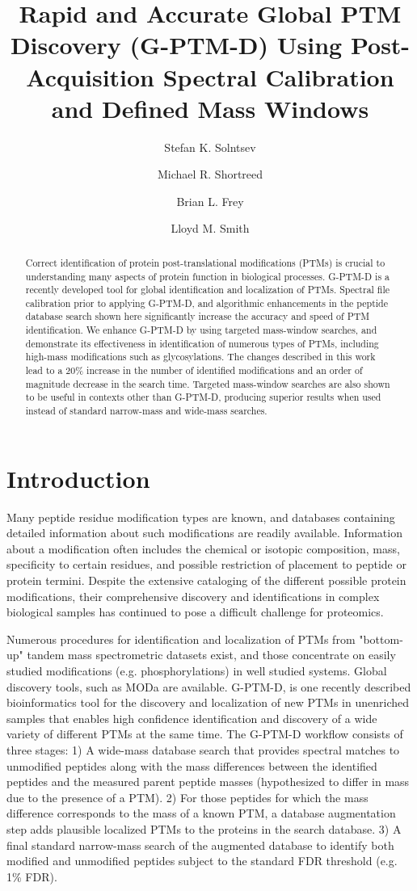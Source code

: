 \documentclass[journal=jprobs,manuscript=article]{achemso}
\author{Stefan K. Solntsev}
\author{Michael R. Shortreed}
\author{Brian L. Frey}
\author{Lloyd M. Smith}
\affiliation[UwMadison]
{University of Wisconsin-Madison}
\title[Rapid and Accurate Global PTM Discovery (G-PTM-D) Using Post-Acquisition Spectral Calibration and Defined Mass Windows]
  {Rapid and Accurate Global PTM Discovery (G-PTM-D) Using Post-Acquisition Spectral Calibration and Defined Mass Windows}
\begin{document}
\begin{abstract}

Correct identification of protein post-translational modifications (PTMs) is crucial to understanding many aspects of protein function in biological processes.
G-PTM-D\cite{Li_2016} is a recently developed tool for global identification and localization of PTMs.
Spectral file calibration prior to applying G-PTM-D, and algorithmic enhancements in the peptide database search shown here significantly increase the accuracy and speed of PTM identification.
We enhance G-PTM-D by using targeted mass-window searches, and demonstrate its effectiveness in identification of numerous types of PTMs, including high-mass modifications such as glycosylations.
The changes described in this work lead to a 20\% increase in the number of identified modifications and an order of magnitude decrease in the search time.
Targeted mass-window searches are also shown to be useful in contexts other than G-PTM-D, producing superior results when used instead of standard narrow-mass and wide-mass searches.
\end{abstract}

\section{Introduction}

Many peptide residue modification types are known, and databases containing detailed information about such modifications are readily available\cite{Creasy_2004}.
Information about a modification often includes the chemical or isotopic composition, mass, specificity to certain residues, and possible restriction of placement to peptide or protein termini.
Despite the extensive cataloging of the different possible protein modifications, their comprehensive discovery and identifications in complex biological samples has continued to pose a difficult challenge for proteomics\cite{Olsen_2013}.

Numerous procedures for identification and localization of PTMs from "bottom-up" tandem mass spectrometric datasets exist, and those concentrate on easily studied modifications (e.g. phosphorylations) in well studied systems.
Global discovery tools, such as MODa\cite{Na_2011} are available.
G-PTM-D\cite{Li_2016}, is one recently described bioinformatics tool for the discovery and localization of new PTMs in unenriched samples that enables high confidence identification and discovery of a wide variety of different PTMs at the same time.
The G-PTM-D workflow consists of three stages: 1) A wide-mass database search\cite{Chick_2015, Na_2011} that provides spectral matches to unmodified peptides along with the mass differences between the identified peptides and the measured parent peptide masses (hypothesized to differ in mass due to the presence of a PTM).
2) For those peptides for which the mass difference corresponds to the mass of a known PTM, a database augmentation step adds plausible localized PTMs to the proteins in the search database.
3) A final standard narrow-mass search of the augmented database to identify both modified and unmodified peptides subject to the standard FDR threshold (e.g. 1\% FDR).
\end{document}

